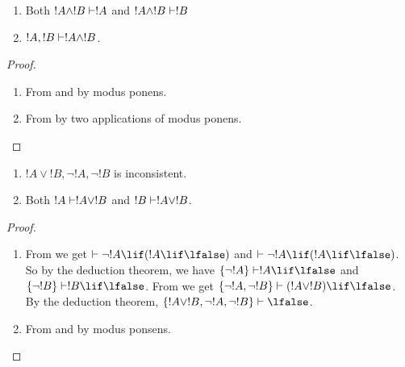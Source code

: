 \documentclass[../../../include/open-logic-section]{subfiles}
\begin{document}
      {}
      {}


\begin{prop}
  \begin{enumerate}
  \item {} Both $!A \land !B \Proves
    !A$ and $!A \land !B \Proves !B$
  \item {} $!A, !B \Proves !A \land !B$.
  \end{enumerate}
\end{prop}

\begin{proof}
  \begin{enumerate}
    \item From  and  by
      modus ponens.
  \item From  by two applications of
    modus ponens.
  \end{enumerate}
\end{proof}


\begin{prop}
  \begin{enumerate}
  \item $!A \lor !B, \lnot !A, \lnot !B$ is inconsistent.
  \item Both $!A \Proves !A \lor !B$ and $!B \Proves !A \lor !B$.
  \end{enumerate}
\end{prop}

\begin{proof}
  \begin{enumerate}
  \item From  we get $\Proves \lnot !A \lif (!A
    \lif \lfalse)$ and $\Proves \lnot !A \lif (!A \lif \lfalse)$. So
    by the deduction theorem, we have $\{\lnot !A\} \Proves !A \lif
    \lfalse$ and $\{\lnot !B\} \Proves !B \lif \lfalse$. From
     we get $\{\lnot !A, \lnot !B\} \Proves (!A
    \lor !B) \lif \lfalse$. By the deduction theorem, $\{!A \lor !B,
    \lnot !A, \lnot !B\} \Proves \lfalse$.
  \item From  and  by modus
    ponsens.
  \end{enumerate}
\end{proof}
\end{document}
